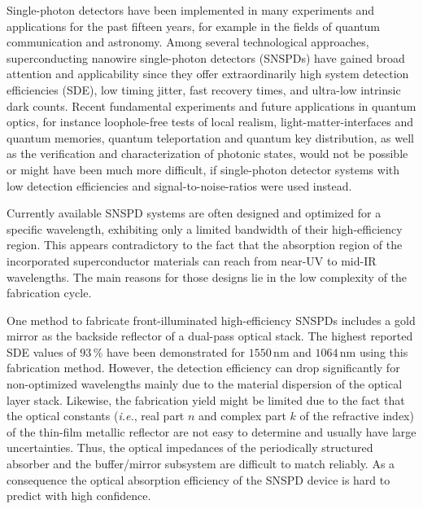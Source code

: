 \documentclass[aip,apl,showpacs,showkeys,preprint,superscriptaddress,preprintnumbers,amsmath,amssymb]{revtex4-1}
\begin{document}
\begin{bibunit}
Single-photon detectors have been implemented in many experiments and applications for the past fifteen years, for example in the fields of quantum communication and astronomy. Among several technological approaches, superconducting nanowire single-photon detectors (SNSPDs) have gained broad attention and applicability since they offer extraordinarily high system detection efficiencies\cite{Marsili2013,Verma2015} (SDE), low timing jitter\cite{Goltsman2001,Dauler2009,Chen2013,Najafi2015a}, fast recovery times\cite{Rosenberg2013,Kerman2013,Verma2014}, and ultra-low intrinsic dark counts\cite{Shibata2015}. Recent fundamental experiments and future applications in quantum optics, for instance loophole-free tests of local realism\cite{Shalm2015}, light-matter-interfaces and quantum memories\cite{Jin2015a,Saglamyurek2016}, quantum teleportation\cite{Takesue2015} and quantum key distribution\cite{Shibata2014}, as well as the verification and characterization of photonic states\cite{Dixon2014,Najafi2015,Weston2016}, would not be possible or might have been much more difficult, if single-photon detector systems with low detection efficiencies and signal-to-noise-ratios were used instead.

Currently available SNSPD systems are often designed and optimized for a specific wavelength\cite{Marsili2013,Zhang2016,Jeannic2016}, exhibiting only a limited bandwidth of their high-efficiency region. This appears contradictory to the fact that the absorption region of the incorporated superconductor materials can reach from near-UV to mid-IR wavelengths\cite{Baek2011}. The main reasons for those designs lie in the low complexity of the fabrication cycle. 

One method to fabricate front-illuminated high-efficiency SNSPDs includes a gold mirror as the backside reflector of a dual-pass optical stack. The highest reported SDE values of $93\,\%$ have been demonstrated for $1550\,\mathrm{nm}$\cite{Marsili2013} and $1064\,\mathrm{nm}$\cite{Jeannic2016} using this fabrication method. However, the detection efficiency can drop significantly for non-optimized wavelengths mainly due to the material dispersion of the optical layer stack. Likewise, the fabrication yield might be limited due to the fact that the optical constants (\textit{i.e.}, real part $n$ and complex part $k$ of the refractive index) of the thin-film metallic reflector are not easy to determine and usually have large uncertainties. Thus, the optical impedances of the periodically structured absorber and the buffer/mirror subsystem are difficult to match reliably. As a consequence the optical absorption efficiency of the SNSPD device is hard to predict with high confidence. 


\end{bibunit}
\end{document}
